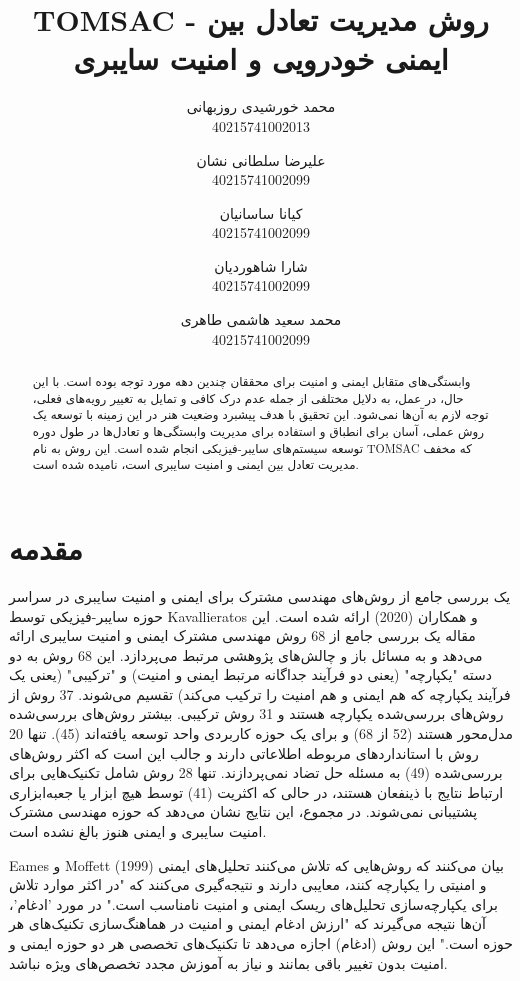 \documentclass[a4paper,10pt]{article}
\title{TOMSAC - روش مدیریت تعادل بین ایمنی خودرویی و امنیت سایبری}
\author{محمد خورشیدی روزبهانی\\40215741002013 \and
علیرضا سلطانی نشان\\40215741002099 \and
کیانا ساسانیان\\40215741002099 \and
شارا شاهوردیان\\40215741002099 \and
محمد سعید هاشمی طاهری\\40215741002099}
\date{}
\begin{document}
    \maketitle

    \begin{abstract}
        
        وابستگی‌های متقابل ایمنی و امنیت برای محققان چندین دهه مورد توجه بوده است. با این حال، در عمل، به دلایل مختلفی از جمله عدم درک کافی و تمایل به تغییر رویه‌های فعلی، توجه لازم به آن‌ها نمی‌شود. این تحقیق با هدف پیشبرد وضعیت هنر در این زمینه با توسعه یک روش عملی، آسان برای انطباق و استفاده برای مدیریت وابستگی‌ها و تعادل‌ها در طول دوره توسعه سیستم‌های سایبر-فیزیکی انجام شده است. این روش به نام TOMSAC که مخفف مدیریت تعادل بین ایمنی و امنیت سایبری است، نامیده شده است.

    \end{abstract}

    \section{مقدمه}

        یک بررسی جامع از روش‌های مهندسی مشترک برای ایمنی و امنیت سایبری در سراسر حوزه سایبر-فیزیکی توسط Kavallieratos و همکاران (2020) ارائه شده است. این مقاله یک بررسی جامع از 68 روش مهندسی مشترک ایمنی و امنیت سایبری ارائه می‌دهد و به مسائل باز و چالش‌های پژوهشی مرتبط می‌پردازد. این 68 روش به دو دسته "یکپارچه" (یعنی دو فرآیند جداگانه مرتبط ایمنی و امنیت) و "ترکیبی" (یعنی یک فرآیند یکپارچه که هم ایمنی و هم امنیت را ترکیب می‌کند) تقسیم می‌شوند. 37 روش از روش‌های بررسی‌شده یکپارچه هستند و 31 روش ترکیبی. بیشتر روش‌های بررسی‌شده مدل‌محور هستند (52 از 68) و برای یک حوزه کاربردی واحد توسعه یافته‌اند (45). تنها 20 روش با استانداردهای مربوطه اطلاعاتی دارند و جالب این است که اکثر روش‌های بررسی‌شده (49) به مسئله حل تضاد نمی‌پردازند. تنها 28 روش شامل تکنیک‌هایی برای ارتباط نتایج با ذینفعان هستند، در حالی که اکثریت (41) توسط هیچ ابزار یا جعبه‌ابزاری پشتیبانی نمی‌شوند. در مجموع، این نتایج نشان می‌دهد که حوزه مهندسی مشترک امنیت سایبری و ایمنی هنوز بالغ نشده است.

        Eames و Moffett (1999) بیان می‌کنند که روش‌هایی که تلاش می‌کنند تحلیل‌های ایمنی و امنیتی را یکپارچه کنند، معایبی دارند و نتیجه‌گیری می‌کنند که "در اکثر موارد تلاش برای یکپارچه‌سازی تحلیل‌های ریسک ایمنی و امنیت نامناسب است." در مورد 'ادغام'، آن‌ها نتیجه می‌گیرند که "ارزش ادغام ایمنی و امنیت در هماهنگ‌سازی تکنیک‌های هر حوزه است." این روش (ادغام) اجازه می‌دهد تا تکنیک‌های تخصصی هر دو حوزه ایمنی و امنیت بدون تغییر باقی بمانند و نیاز به آموزش مجدد تخصص‌های ویژه نباشد.
\end{document}
